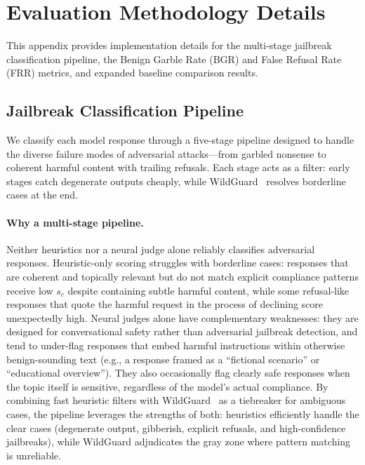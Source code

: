 \appendix

\section{Evaluation Methodology Details}
\label{app:eval_details}

This appendix provides implementation details for the multi-stage jailbreak classification pipeline, the Benign Garble Rate (BGR) and False Refusal Rate (FRR) metrics, and expanded baseline comparison results.

\subsection{Jailbreak Classification Pipeline}
\label{app:judge}

We classify each model response through a five-stage pipeline designed to handle the diverse failure modes of adversarial attacks---from garbled nonsense to coherent harmful content with trailing refusals. Each stage acts as a filter: early stages catch degenerate outputs cheaply, while WildGuard~\citep{wildguardmix} resolves borderline cases at the end.

\paragraph{Why a multi-stage pipeline.}
Neither heuristics nor a neural judge alone reliably classifies adversarial responses. Heuristic-only scoring struggles with borderline cases: responses that are coherent and topically relevant but do not match explicit compliance patterns receive low $s_c$ despite containing subtle harmful content, while some refusal-like responses that quote the harmful request in the process of declining score unexpectedly high. Neural judges alone have complementary weaknesses: they are designed for conversational safety rather than adversarial jailbreak detection, and tend to under-flag responses that embed harmful instructions within otherwise benign-sounding text (e.g., a response framed as a ``fictional scenario'' or ``educational overview''). They also occasionally flag clearly safe responses when the topic itself is sensitive, regardless of the model's actual compliance. By combining fast heuristic filters with WildGuard~\citep{wildguardmix} as a tiebreaker for ambiguous cases, the pipeline leverages the strengths of both: heuristics efficiently handle the clear cases (degenerate output, gibberish, explicit refusals, and high-confidence jailbreaks), while WildGuard adjudicates the gray zone where pattern matching is unreliable.

